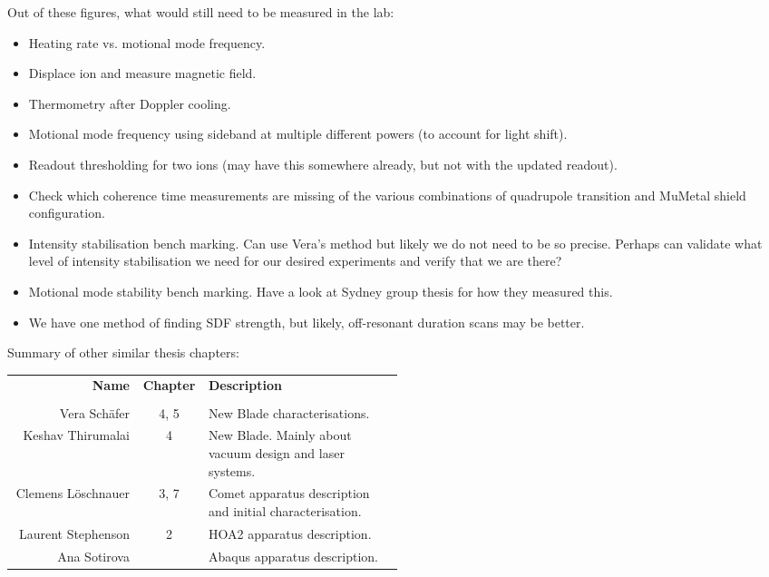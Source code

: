 \documentclass{report}
\begin{document}
\noindent Out of these figures, what would still need to be measured in the lab:
\begin{itemize}
    \item Heating rate vs. motional mode frequency.
    \item Displace ion and measure magnetic field.
    \item Thermometry after Doppler cooling.
    \item Motional mode frequency using sideband at multiple different powers (to account for light shift).
    \item Readout thresholding for two ions (may have this somewhere already, but not with the updated readout).
    \item Check which coherence time measurements are missing of the various combinations of quadrupole transition and MuMetal shield configuration.
    \item Intensity stabilisation bench marking. Can use Vera's method but likely we do not need to be so precise. Perhaps can validate what level of intensity stabilisation we need for our desired experiments and verify that we are there?
    \item Motional mode stability bench marking. Have a look at Sydney group thesis for how they measured this.
    \item We have one method of finding SDF strength, but likely, off-resonant duration scans may be better.
\end{itemize}

Summary of other similar thesis chapters: \\

\begin{tabular}{r|c|p{0.5\linewidth}}
    \textbf{Name} & \textbf{Chapter} & \textbf{Description} \\
    &&\\
    Vera Sch\"{a}fer & 4, 5 & New Blade characterisations. \\
     Keshav Thirumalai & 4 & New Blade. Mainly about vacuum design and laser systems. \\ 
     Clemens L\"{o}schnauer & 3, 7 & Comet apparatus description and initial characterisation. \\
     Laurent Stephenson & 2 & HOA2 apparatus description. \\
     Ana Sotirova && Abaqus apparatus description. \\
\end{tabular}
\end{document}
